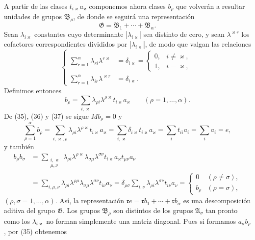 A partir de las clases $t_{i\varkappa}a_\varkappa$ componemos ahora clases $b_\rho$ que volverán a resultar unidades de grupos $\mathfrak B_\rho$, de donde se seguirá una representación
\[
 \mathfrak G=\mathfrak B_1+\cdots+\mathfrak B_\alpha.
\]
Sean $\lambda_{i\varkappa}$ constantes cuyo determinante $|\lambda_{i\varkappa}|$ sea distinto de cero, y sean $\lambda^{\varkappa r}$ los cofactores correspondientes divididos por $|\lambda_{i\varkappa}|$, de modo que valgan las relaciones
\begin{equation}
\left\{
\begin{aligned}
 \sum_{r=1}^{\alpha}\lambda_{ri}\lambda^{r\varkappa}&=\delta_{i\varkappa}=\begin{cases}0,&i\ne\varkappa,\\1,&i=\varkappa,
 \end{cases}\\
 \sum_{r=1}^{\alpha}\lambda_{ir}\lambda^{\varkappa r}&=\delta_{i\varkappa}.
\end{aligned}\right.
\tag{36}
\end{equation}
Definimos entonces
\begin{equation}
 b_\rho=\sum_{i,\varkappa}\lambda_{\rho i}\lambda^{\rho\varkappa}t_{i\varkappa}a_\varkappa
 \qquad(\rho=1,
\ldots,\alpha).
\tag{37}
\end{equation}
De (35), (36) y (37) se sigue $Mb_\rho=0$ y
\begin{equation}
 \sum_{\rho=1}^{\alpha}b_\rho
 =\sum_{i,\varkappa,\rho}\lambda_{\rho i}\lambda^{\rho\varkappa}t_{i\varkappa}a_\varkappa
 =\sum_{i,\varkappa}\delta_{i\varkappa}t_{i\varkappa}a_\varkappa
 =\sum_i t_{ii}a_i=\sum_i a_i=e,
\tag{38}
\end{equation}
y también
\[
\begin{aligned}
 b_\rho b_\sigma
 &=\sum_{\substack{i,\varkappa\\ \mu,\nu}}
  \lambda_{\rho i}\lambda^{\rho\varkappa}\lambda_{\sigma\mu}\lambda^{\sigma\nu}
  t_{i\varkappa}a_\varkappa t_{\mu\nu}a_\nu \\
 &=\sum_{i,\mu,\nu}\lambda_{\rho i}\lambda^{\rho\mu}\lambda_{\sigma\mu}\lambda^{\sigma\nu}t_{i\nu}a_\nu
 =\delta_{\rho\sigma}\sum_{i,\nu}\lambda_{\rho i}\lambda^{\sigma\nu}t_{i\nu}a_\nu
 =\begin{cases}0&(\rho\ne\sigma),\\ b_\rho&(\rho=\sigma),\end{cases}
\end{aligned}
\]
$(\rho,\sigma=1,\ldots,\alpha)$. Así, la representación $\mathfrak r e=\mathfrak r b_1+\cdots+\mathfrak r b_\alpha$ es una descomposición aditiva del grupo $\mathfrak G$. Los grupos $\mathfrak B_\rho$ son distintos de los grupos $\mathfrak A_\sigma$ tan pronto como los $\lambda_{i\varkappa}$ no forman simplemente una matriz diagonal. Pues si formamos $a_\sigma b_\rho$, por (35) obtenemos
